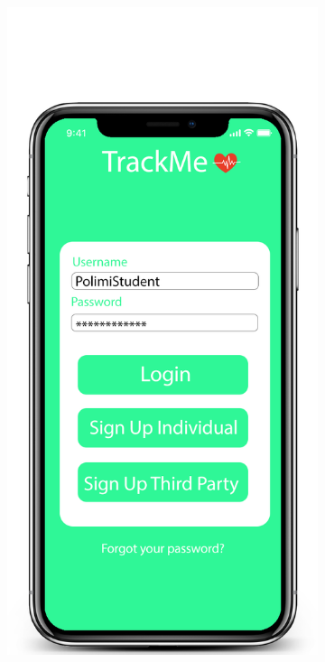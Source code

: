\documentclass[12pt]{article}
\begin{document}
\newpage
\begin{figure}[t!]
\centering
    \begin{subfigure}{.4\textwidth}
        \includegraphics[scale=0.2]{LoginScreen.png}
        \label{fig:loginScreen}

\end{subfigure}
\end{figure}
\end{document}
